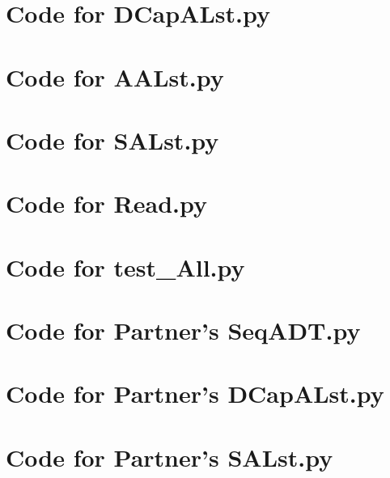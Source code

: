 \documentclass[12pt]{article}
\begin{document}
\noindent 

\newpage

\section{Code for DCapALst.py}

\noindent 

\newpage

\section{Code for AALst.py}

\noindent 

\newpage

\section{Code for SALst.py}

\noindent 

\newpage

\section{Code for Read.py}

\noindent 

\newpage

\section{Code for test\_All.py}

\noindent 

\newpage

\section{Code for Partner's SeqADT.py}

\noindent 

\newpage

\section{Code for Partner's DCapALst.py}

\noindent 

\newpage

\section{Code for Partner's SALst.py}

\noindent 
\end{document}

